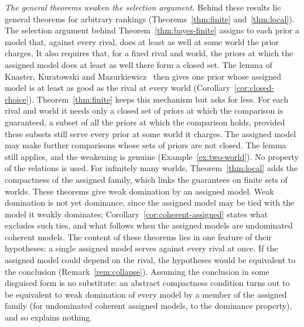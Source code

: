 \documentclass[11pt]{article}
\theoremstyle{definition}
\theoremstyle{remark}
\begin{document}
\emph{The general theorems weaken the selection argument.} Behind these results lie general theorems for arbitrary rankings (Theorems~\ref{thm:finite} and~\ref{thm:local}). The selection argument behind Theorem~\ref{thm:bayes-finite} assigns to each prior a model that, against every rival, does at least as well at some world the prior charges. It also requires that, for a fixed rival and world, the priors at which the assigned model does at least as well there form a closed set. The lemma of Knaster, Kuratowski and Mazurkiewicz~\cite{KKM} then gives one prior whose assigned model is at least as good as the rival at every world (Corollary~\ref{cor:closed-choice}). Theorem~\ref{thm:finite} keeps this mechanism but asks for less. For each rival and world it needs only a closed set of priors at which the comparison is guaranteed, a subset of all the priors at which the comparison holds, provided these subsets still serve every prior at some world it charges. The assigned model may make further comparisons whose sets of priors are not closed. The lemma still applies, and the weakening is genuine (Example~\ref{ex:two-world}). No property of the relations is used. For infinitely many worlds, Theorem~\ref{thm:local} adds the compactness of the assigned family, which links the guarantees on finite sets of worlds. These theorems give weak domination by an assigned model. Weak domination is not yet dominance, since the assigned model may be tied with the model it weakly dominates; Corollary~\ref{cor:coherent-assigned} states what excludes such ties, and what follows when the assigned models are undominated coherent models. The content of these theorems lies in one feature of their hypotheses: a single assigned model serves against every rival at once. If the assigned model could depend on the rival, the hypotheses would be equivalent to the conclusion (Remark~\ref{rem:collapse}). Assuming the conclusion in some disguised form is no substitute: an abstract compactness condition turns out to be equivalent to weak domination of every model by a member of the assigned family (for undominated coherent assigned models, to the dominance property), and so explains nothing.
\end{document}
